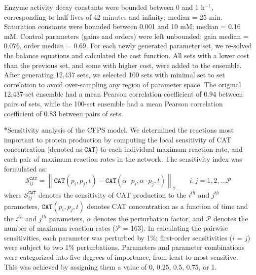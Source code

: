 \documentclass[12pt]{article}
\makeatletter
\renewcommand\subsection{\@startsection
	{subsection}{2}{0mm}
	{-0.05in}
	{-0.5\baselineskip}
	{\normalfont\normalsize\bfseries}}
\newcommand{\norm}[1]{\left\lVert#1\right\rVert}
\makeatother
\begin{document}
Enzyme activity decay constants were bounded between 0 and 1 h$^{-1}$, corresponding to half lives of 42 minutes and infinity; median = 25 min.
Saturation constants were bounded between 0.001 and 10 mM; median = 0.16 mM.
Control parameters (gains and orders) were left unbounded; gain median = 0.076, order median = 0.69.
For each newly generated parameter set, we re-solved the balance equations and calculated the cost function.
All sets with a lower cost than the previous set, and some with higher cost, were added to the ensemble.
After generating 12,437 sets, we selected 100 sets with minimal set to set correlation to avoid over-sampling any region of parameter space.
The original 12,437-set ensemble had a mean Pearson correlation coefficient of 0.94 between pairs of sets, while the 100-set ensemble had a mean Pearson correlation coefficient of 0.83 between pairs of sets.

\subsection*{Sensitivity analysis of the CFPS model.}
We determined the reactions most important to protein production by computing the local sensitivity of CAT concentration (denoted as $\texttt{CAT}$) to each individual maximum reaction rate, and each pair of maximum reaction rates in the network.
The sensitivity index was formulated as:
\begin{equation}\label{eqn:CAT-sensitivity}
    \mathcal{S}_{ij}^{\texttt{CAT}} = \norm{\texttt{CAT}(p_i,p_j,t)-\texttt{CAT}(\alpha \cdot p_i,\alpha \cdot p_j,t)}_{2}\qquad{i,j=1,2,\hdots\mathcal{P}}
\end{equation}
where $\mathcal{S}_{ij}^{\texttt{CAT}}$ denotes the sensitivity of CAT production to the $i^{th}$ and $j^{th}$ parameters,
$\texttt{CAT}(p_i,p_j,t)$ denotes CAT concentration as a function of time and the $i^{th}$ and $j^{th}$ parameters,
$\alpha$ denotes the perturbation factor, and $\mathcal{P}$ denotes the number of maximum reaction rates ($\mathcal{P}$ = 163).
In calculating the pairwise sensitivities, each parameter was perturbed by 1\%; first-order sensitivities ($i$ = $j$) were subject to two 1\% perturbations.
Parameters and parameter combinations were categorized into five degrees of importance, from least to most sensitive.
This was achieved by assigning them a value of 0, 0.25, 0.5, 0.75, or 1.
\end{document}
